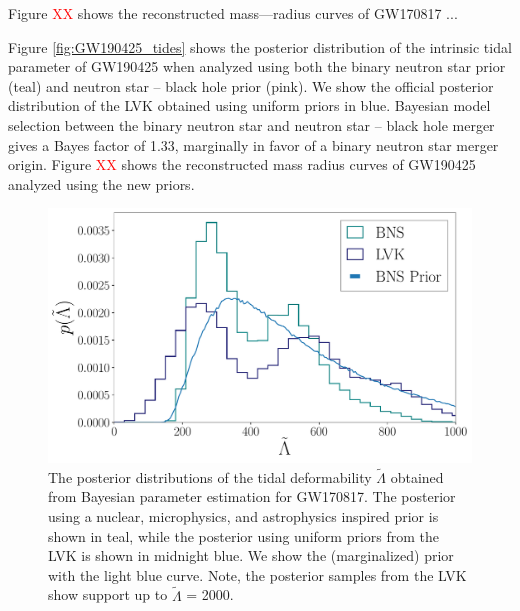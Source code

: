 \documentclass[twocolumn]{aastex631}
\newcommand{\red}[1]{\textcolor{red}{#1}}
\begin{document}
Figure \red{XX} shows the reconstructed mass---radius curves of GW170817 ... 

Figure \ref{fig:GW190425_tides} shows the posterior distribution of the intrinsic tidal parameter of GW190425 when analyzed using both the binary neutron star prior (teal) and neutron star -- black hole prior (pink). We show the official posterior distribution of the LVK obtained using uniform priors in blue. 
Bayesian model selection between the binary neutron star and neutron star -- black hole merger gives a Bayes factor of 1.33, marginally in favor of a binary neutron star merger origin. 
Figure \red{XX} shows the reconstructed mass radius curves of GW190425 analyzed using the new priors.  
\begin{figure}[H]
		\centering
		\includegraphics[width=1.\linewidth]{Fig_2_GW170817_lambda_tilde_posteriors_BNS.pdf}
		\caption{The posterior distributions of the tidal deformability $\tilde{\Lambda}$ obtained from Bayesian parameter estimation for GW170817. The posterior using a nuclear, microphysics, and astrophysics inspired prior is shown in teal, while the posterior using uniform priors from the LVK is shown in midnight blue. We show the (marginalized) prior with the light blue curve. Note, the posterior samples from the LVK show support up to $\tilde{\Lambda}$ = 2000. }
		\label{fig:GW170817_tides}
\end{figure}
	
\end{document}
